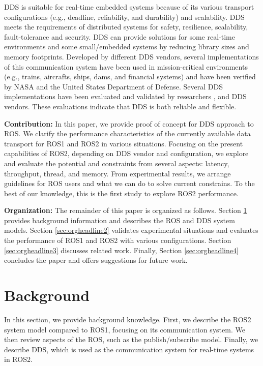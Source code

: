 \documentclass{sig-alternate-05-2015}
\begin{document}
DDS is suitable for real-time embedded systems because of its various transport configurations (e.g., deadline, reliability, and durability) and scalability.
DDS meets the requirements of distributed systems for safety, resilience, scalability, fault-tolerance and security.
DDS can provide solutions for some real-time environments and some small/embedded systems by reducing library sizes and memory footprints.
Developed by different DDS vendors, several implementations of this communication system have been used in mission-critical environments (e.g., trains, aircrafts, ships, dams, and financial systems) and have been verified by NASA and the United States Department of Defense. 
Several DDS implementations have been evaluated and validated by researchers \cite{xiong2010evaluating}, \cite{sierla2003evaluation} and DDS vendors.
These evaluations indicate that DDS is both reliable and flexible.

\textbf{Contribution:}
In this paper, we provide proof of concept for DDS approach to ROS.
We clarify the performance characteristics of the currently available data transport for ROS1 and ROS2 in various situations.
Focusing on the present capabilities of ROS2, depending on DDS vendor and configuration, we explore and evaluate the potential and constraints from several aspects: latency, throughput, thread, and memory.
From experimental results, we arrange guidelines for ROS users and what we can do to solve current constrains.
To the best of our knowledge, this is the first study to explore ROS2 performance.

\textbf{Organization:} 
The remainder of this paper is organized as follows. 
Section \ref{sec:orgheadline1} provides background information and describes the ROS and DDS system models. 
Section \ref{sec:orgheadline2} validates experimental situations and evaluates the performance of ROS1 and ROS2 with various configurations. 
Section \ref{sec:orgheadline3} discusses related work. 
Finally, Section \ref{sec:orgheadline4} concludes the paper and offers suggestions for future work.


\section{Background}
\label{sec:orgheadline1}

In this section, we provide background knowledge. 
First, we describe the ROS2 system model compared to ROS1, focusing on its communication system. 
We then review aspects of the ROS, such as the publish/subscribe model. 
Finally, we describe DDS, which is used as the communication system for real-time systems in ROS2. 
\end{document}
